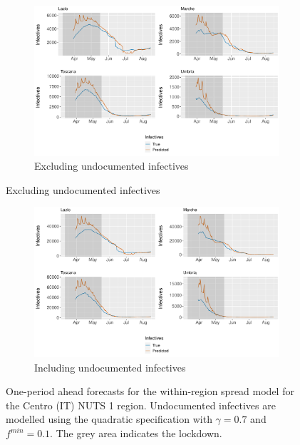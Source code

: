 \documentclass[12pt]{article}
\begin{document}
\begin{appendices}
		\begin{figure}[H]
    	    \centering
    	    \begin{subfigure}{\textwidth}
    	      \centering
    	      \includegraphics[width=0.92\linewidth]{output/model_within_lag14_forecast_start20_Centro (IT)_rolling.pdf}
    	      \caption{Excluding undocumented infectives}
    	      \label{fig:forecast_within_centro_regular}
    	    \end{subfigure}
        \end{figure}
        \begin{figure}[H]\ContinuedFloat
    	    \begin{subfigure}{\textwidth}
    	      \centering
    	      \includegraphics[width=0.92\linewidth]{output/model_within_lag14_forecast_start20_Centro (IT)_UndocQuadratic_rolling.pdf}
    	      \caption{Including undocumented infectives}
    	      \label{fig:forecast_within_centro_undoc}
    	    \end{subfigure}
    	    \caption{One-period ahead forecasts for the within-region spread model for the Centro (IT) NUTS 1 region. Undocumented infectives are modelled using the quadratic specification with $\gamma = 0.7$ and $f^{min}=0.1$. The grey area indicates the lockdown.}
    	    \label{fig:forecast_within_centro}
        \end{figure}
		

\end{appendices}
\end{document}
